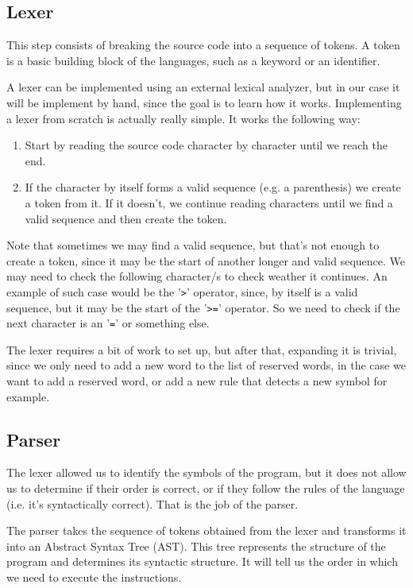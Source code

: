 ﻿\documentclass[10pt,a4paper,twocolumn,twoside]{article}
\begin{document}
\subsection{Lexer} 
This step consists of breaking the source code into a sequence of tokens. A
token is a basic building block of the languages, such as a keyword or an
identifier.

A lexer can be implemented using an external lexical analyzer, but in our case
it will be implement by hand, since the goal is to learn how it works. 
Implementing a lexer from scratch is actually really simple. It works the 
following way:

\begin{enumerate}
    \item Start by reading the source code character by character until we reach
        the end.
    \item If the character by itself forms a valid sequence (e.g. a parenthesis)
        we create a token from it. If it doesn't, we continue reading characters
        until we find a valid sequence and then create the token.
\end{enumerate}

Note that sometimes we may find a valid sequence, but that's not enough to
create a token, since it may be the start of another longer and valid sequence.
We may need to check the following character/s to check weather it continues. An
example of such case would be the '\texttt{>}' operator, since, by itself is a
valid sequence, but it may be the start of the '\texttt{>=}' operator. So we
need to check if the next character is an '\texttt{=}' or something else.

The lexer requires a bit of work to set up, but after that, expanding it is 
trivial, since we only need to add a new word to the list of reserved words, in 
the case we want to add a reserved word, or add a new rule that detects a new 
symbol for example.


\subsection{Parser}
The lexer allowed us to identify the symbols of the program, but it does not 
allow us to determine if their order is correct, or if they follow the rules of
the language (i.e. it's syntactically correct). That is the job of the parser.

The parser takes the sequence of tokens obtained from the lexer and
transforms it into an Abstract Syntax Tree (AST). This tree represents the
structure of the program and determines its syntactic structure. It will tell us
the order in which we need to execute the instructions.
\end{document}
